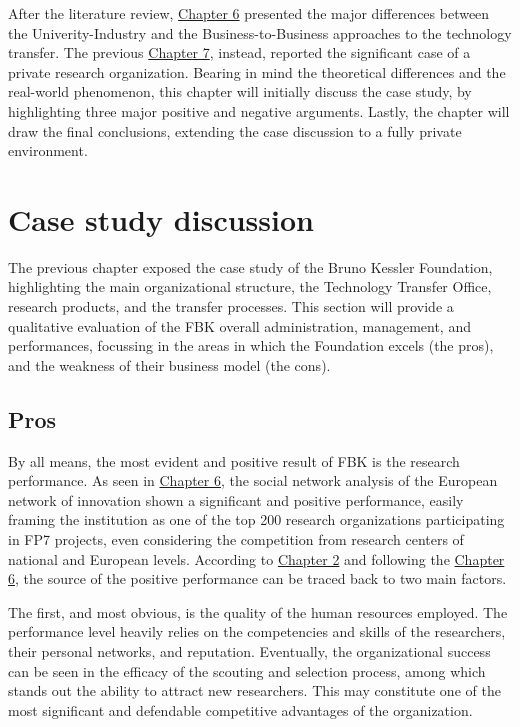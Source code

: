 

\label{Chapter8} %

After the literature review, \hyperref[Chapter6]{Chapter 6} presented the major differences between the Univerity-Industry and the Business-to-Business approaches to the technology transfer. The previous \hyperref[Chapter7]{Chapter 7}, instead, reported the significant case of a private research organization. Bearing in mind the theoretical differences and the real-world phenomenon, this chapter will initially discuss the case study, by highlighting three major positive and negative arguments. Lastly, the chapter will draw the final conclusions, extending the case discussion to a fully private environment.

\section{Case study discussion}

The previous chapter exposed the case study of the Bruno Kessler Foundation, highlighting the main organizational structure, the Technology Transfer Office, research products, and the transfer processes. This section will provide a qualitative evaluation of the FBK overall administration, management, and performances, focussing in the areas in which the Foundation excels (the pros), and the weakness of their business model (the cons).

\subsection{Pros}

By all means, the most evident and positive result of FBK is the research performance. As seen in \hyperref[Chapter6]{Chapter 6}, the social network analysis of the European network of innovation shown a significant and positive performance, easily framing the institution as one of the top 200 research organizations participating in FP7 projects, even considering the competition from research centers of national and European levels. According to \hyperref[Chapter2]{Chapter 2} and following the \hyperref[Chapter6]{Chapter 6}, the source of the positive performance can be traced back to two main factors.

The first, and most obvious, is the quality of the human resources employed. The performance level heavily relies on the competencies and skills of the researchers, their personal networks, and reputation. Eventually, the organizational success can be seen in the efficacy of the scouting and selection process, among which stands out the ability to attract new researchers. This may constitute one of the most significant and defendable competitive advantages of the organization. 


